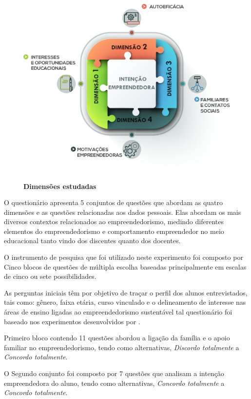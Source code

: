 \begin{figure}[H]
\centering
\caption{\textbf{Dimensões estudadas}}
\includegraphics[scale=0.35]{Imagens/dimencoes.png}
\label{figura_9}
\end{figure}


O questionário apresenta 5 conjuntos de questões que abordam as quatro dimensões e as questões relacionadas aos dados pessoais. Elas abordam os mais diversos contextos relacionados ao empreendedorismo, medindo diferentes elementos do empreendedorismo e comportamento empreendedor no meio educacional tanto vindo dos discentes quanto dos docentes. 

O instrumento de pesquisa que foi utilizado neste experimento foi composto por Cinco blocos de questões de múltipla escolha baseadas principalmente em escalas de cinco ou sete possibilidades.

As perguntas iniciais têm por objetivo de traçar o perfil dos alunos entrevistados, tais como: gênero, faixa etária, curso vinculado e o delineamento de interesse nas áreas de ensino ligadas ao empreendedorismo sustentável tal questionário foi baseado nos experimentos desenvolvidos por .

Primeiro bloco contendo 11 questões abordou a ligação da família e o apoio familiar no empreendedorismo, tendo como alternativas, \textit{Discordo totalmente} a \textit{Concordo totalmente}.

O Segundo conjunto foi composto por 7 questões que analisam a intenção empreendedora do aluno, tendo como alternativas, \textit{Concordo totalmente} a \textit{Concordo totalmente}.

